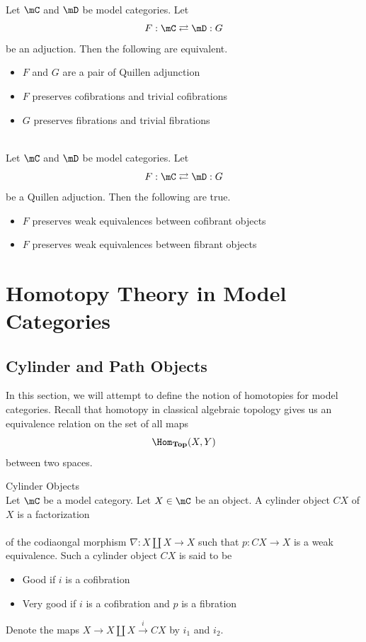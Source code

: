 \documentclass[a4paper]{article}
\begin{document}
\begin{thm}{}{}\\ Let $\mC$ and $\mD$ be model categories. Let $$F:\mC\rightleftarrows\mD:G$$ be an adjuction. Then the following are equivalent. 
\begin{itemize}
\item $F$ and $G$ are a pair of Quillen adjunction
\item $F$ preserves cofibrations and trivial cofibrations
\item $G$ preserves fibrations and trivial fibrations
\end{itemize}
\end{thm}

\begin{prp}{}{}\\ Let $\mC$ and $\mD$ be model categories. Let $$F:\mC\rightleftarrows\mD:G$$ be a Quillen adjuction. Then the following are true. 
\begin{itemize}
\item $F$ preserves weak equivalences between cofibrant objects
\item $F$ preserves weak equivalences between fibrant objects
\end{itemize}
\end{prp}

\pagebreak
\section{Homotopy Theory in Model Categories}
\subsection{Cylinder and Path Objects}
In this section, we will attempt to define the notion of homotopies for model categories. Recall that homotopy in classical algebraic topology gives us an equivalence relation on the set of all maps $$\Hom_{\bold{Top}}(X,Y)$$ between two spaces. 

\begin{defn}{Cylinder Objects}{}\\ Let $\mC$ be a model category. Let $X\in\mC$ be an object. A cylinder object $CX$ of $X$ is a factorization \\
\\
of the codiaongal morphism $\nabla:X\coprod X\to X$ such that $p:CX\to X$ is a weak equivalence. Such a cylinder object $CX$ is said to be 
\begin{itemize}
\item Good if $i$ is a cofibration
\item Very good if $i$ is a cofibration and $p$ is a fibration
\end{itemize}
Denote the maps $X\to X\coprod X\overset{i}{\longrightarrow}CX$ by $i_1$ and $i_2$. 
\end{defn}
\end{document}
